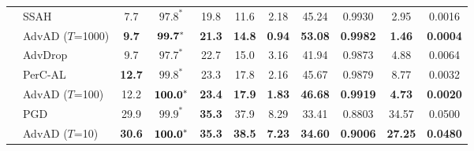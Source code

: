 \documentclass{article}
\begin{document}
\begin{table}[t]
{\begin{tabular}{clccccccccc}
        \midrule
              & SSAH \cite{luo2022frequency}              & 7.7       & $\text{97.8}^*$      & 19.8      & 11.6      & 2.18      & 45.24     & 0.9930    & 2.95      & 0.0016 \\
                                                & AdvAD ($T$=1000)    & \textbf{9.7}       & $\text{\textbf{99.7}}^*$      & \textbf{21.3}      & \textbf{14.8}      & \textbf{0.94}      & \textbf{53.08}     & \textbf{0.9982}    & \textbf{1.46}      & \textbf{0.0004} \\
        \cmidrule(lr){2-11}
                                                & AdvDrop \cite{duan2021advdrop}           & 9.7       & $\text{97.7}^*$      & 22.7      & 15.0      & 3.16      & 41.94     & 0.9873    & 4.88      & 0.0064 \\
                                                & PerC-AL \cite{zhao2020towards}           & \textbf{12.7}      & $\text{99.8}^*$      & 23.3      & 17.8      & 2.16      & 45.67     & 0.9879    & 8.77      & 0.0032 \\
                                                & AdvAD ($T$=100)     & 12.2      & $\text{\textbf{100.0}}^*$    & \textbf{23.4}      & \textbf{17.9}      & \textbf{1.83}      & \textbf{46.68}     & \textbf{0.9919}    & \textbf{4.73}      & \textbf{0.0020} \\
        \cmidrule(lr){2-11}                                        
                                                & PGD \cite{madry2018towards}               & 29.9      & $\text{99.9}^*$      & \textbf{35.3}      & 37.9      & 8.29      & 33.41     & 0.8803    & 34.57     & 0.0500 \\
                                                & AdvAD ($T$=10)      & \textbf{30.6}     & $\text{\textbf{100.0}}^*$      & \textbf{35.3}      & \textbf{38.5}      & \textbf{7.23}      & \textbf{34.60}     & \textbf{0.9006}    & \textbf{27.25}     & \textbf{0.0480} \\
        \bottomrule
    \end{tabular}}
    \vspace{-0.5cm}
\end{table}
\end{document}
